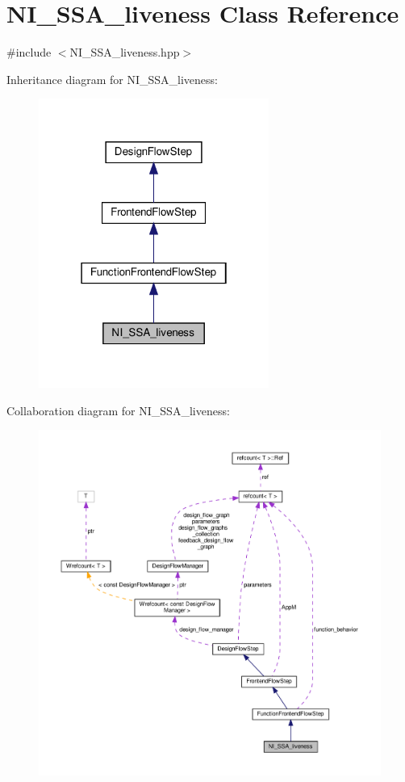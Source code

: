\hypertarget{classNI__SSA__liveness}{}\section{N\+I\+\_\+\+S\+S\+A\+\_\+liveness Class Reference}
\label{classNI__SSA__liveness}


{\ttfamily \#include $<$N\+I\+\_\+\+S\+S\+A\+\_\+liveness.\+hpp$>$}



Inheritance diagram for N\+I\+\_\+\+S\+S\+A\+\_\+liveness\+:
\nopagebreak
\begin{figure}[H]
\begin{center}
\leavevmode
\includegraphics[width=214pt]{db/d85/classNI__SSA__liveness__inherit__graph}
\end{center}
\end{figure}


Collaboration diagram for N\+I\+\_\+\+S\+S\+A\+\_\+liveness\+:
\nopagebreak
\begin{figure}[H]
\begin{center}
\leavevmode
\includegraphics[width=350pt]{d7/d13/classNI__SSA__liveness__coll__graph}
\end{center}
\end{figure}
